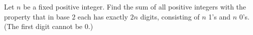 Let $n$ be a fixed positive integer. Find the sum of all positive integers with the property that in base $2$ each has exactly $2n$ digits, consisting of $n$ 1's and $n$ 0's. (The first digit cannot be $0$.)